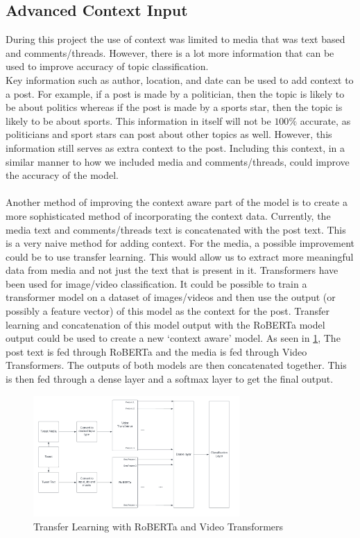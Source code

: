 \subsection{Advanced Context Input}
During this project the use of context was limited to media that was text based and comments/threads. However, there is a lot more information that can
be used to improve accuracy of topic classification.\\
Key information such as author, location, and date can be used to add context to a post. For example, if a post is made by a politician, then the topic is
likely to be about politics whereas if the post is made by a sports star, then the topic is likely to be about sports. This information in itself will not
be $100\%$ accurate, as politicians and sport stars can post about other topics as well. However, this information still serves as extra context to the post.
Including this context, in a similar manner to how we included media and comments/threads, could improve the accuracy of the model.\\\\
Another method of improving the context aware part of the model is to create a more sophisticated method of incorporating the context data. Currently, the
media text and comments/threads text is concatenated with the post text. This is a very naive method for adding context. For the media, a possible improvement
could be to use transfer learning. This would allow us to extract more meaningful data from media and not just the text that is present in it. Transformers
have been used for image/video classification. It could be possible to train a transformer model on a dataset of images/videos
and then use the output (or possibly a feature vector) of this model as the context for the post. Transfer learning and 
concatenation of this model output with the RoBERTa model output could be used to create a new `context aware' model.
As seen in \cref{fig:transfer-learning}, The post text is fed through RoBERTa and the media is fed through Video Transformers. The outputs of both models
are then concatenated together. This is then fed through a dense layer and a softmax layer to get the final output.
\begin{figure}[hbtp]
    \centering
    \includegraphics[width=0.7\textwidth]{../images/transfer-learning.png}
    \caption{Transfer Learning with RoBERTa and Video Transformers}
    \label{fig:transfer-learning}
\end{figure}

